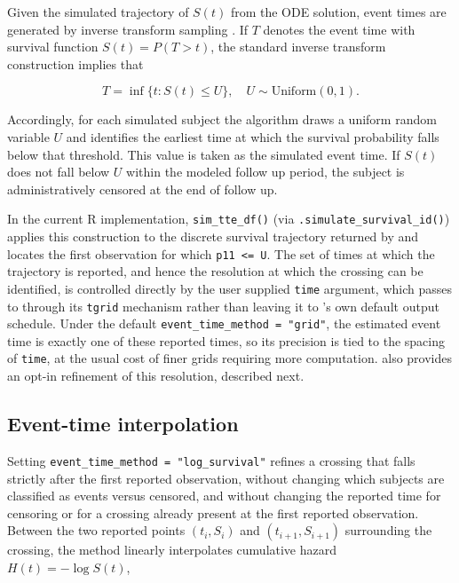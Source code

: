 Given the simulated trajectory of \(S(t)\) from the ODE solution, event times are generated by inverse transform sampling \citep{bender2005}. If
\(T\) denotes the event time with survival function \(S(t)=P(T>t)\), the standard inverse transform construction implies that

\[T = \inf\{t : S(t) \leq U\}, \quad U \sim \text{Uniform}(0,1).\]

Accordingly, for each simulated subject the algorithm draws a uniform random variable \(U\) and identifies the earliest time at which the survival probability falls below that threshold. This value is taken as the simulated event time. If \(S(t)\) does not fall below \(U\) within the modeled follow up period, the subject is administratively censored at the end of follow up.

In the current R implementation, \texttt{sim\_tte\_df()} (via \texttt{.simulate\_survival\_id()}) applies this construction to the discrete survival trajectory returned by  and locates the first observation for which \texttt{p11\ \textless{}=\ U}. The set of times at which the trajectory is reported, and hence the resolution at which the crossing can be identified, is controlled directly by the user supplied \texttt{time} argument, which  passes to  through its \texttt{tgrid} mechanism rather than leaving it to 's own default output schedule. Under the default \texttt{event\_time\_method\ =\ "grid"}, the estimated event time is exactly one of these reported times, so its precision is tied to the spacing of \texttt{time}, at the usual cost of finer grids requiring more computation.  also provides an opt-in refinement of this resolution, described next.

\subsection{Event-time interpolation}\label{event-time-interpolation}

Setting \texttt{event\_time\_method\ =\ "log\_survival"} refines a crossing that falls strictly after the first reported observation, without changing which subjects are classified as events versus censored, and without changing the reported time for censoring or for a crossing already present at the first reported observation. Between the two reported points \((t_i, S_i)\) and \((t_{i+1}, S_{i+1})\) surrounding the crossing, the method linearly interpolates cumulative hazard \(H(t) = -\log S(t)\),

